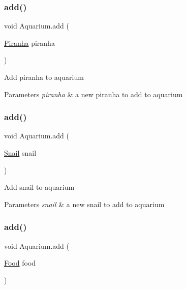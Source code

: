 \subsubsection{\texorpdfstring{add()}{add()}\hspace{0.1cm}{\footnotesize\ttfamily [2/5]}}
{\footnotesize\ttfamily void Aquarium.\+add (\begin{DoxyParamCaption}\item[{\mbox{\hyperlink{class_piranha}{Piranha}}}]{piranha }\end{DoxyParamCaption})\hspace{0.3cm}{\ttfamily [inline]}}

Add piranha to aquarium 
\begin{DoxyParams}{Parameters}
{\em piranha} & a new piranha to add to aquarium \\
\hline
\end{DoxyParams}
\mbox{\label{class_aquarium_a884820c46118fdbc25936f01d3d06a2f}} 
\subsubsection{\texorpdfstring{add()}{add()}\hspace{0.1cm}{\footnotesize\ttfamily [3/5]}}
{\footnotesize\ttfamily void Aquarium.\+add (\begin{DoxyParamCaption}\item[{\mbox{\hyperlink{class_snail}{Snail}}}]{snail }\end{DoxyParamCaption})\hspace{0.3cm}{\ttfamily [inline]}}

Add snail to aquarium 
\begin{DoxyParams}{Parameters}
{\em snail} & a new snail to add to aquarium \\
\hline
\end{DoxyParams}
\mbox{\label{class_aquarium_a92553ce7aa392910522f243f10965570}} 
\subsubsection{\texorpdfstring{add()}{add()}\hspace{0.1cm}{\footnotesize\ttfamily [4/5]}}
{\footnotesize\ttfamily void Aquarium.\+add (\begin{DoxyParamCaption}\item[{\mbox{\hyperlink{class_food}{Food}}}]{food }\end{DoxyParamCaption})\hspace{0.3cm}{\ttfamily [inline]}}

